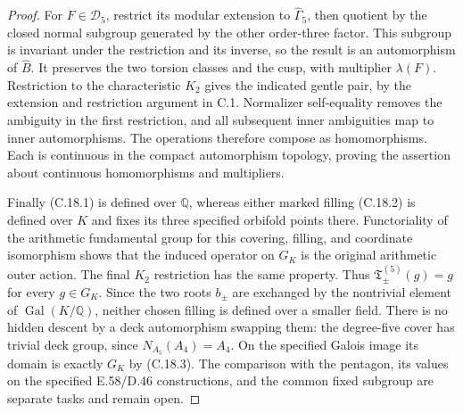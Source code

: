 \begin{proof}
For $F\in\mathcal D_5$, restrict its modular extension to
$\widehat\Gamma_5$, then quotient by the closed normal
subgroup generated by the other order-three factor. This
subgroup is invariant under the restriction and its inverse,
so the result is an automorphism of $\widehat B$.
It preserves the two torsion classes and the cusp, with
multiplier $\lambda(F)$. Restriction to the characteristic
$K_2$ gives the indicated gentle pair, by the extension and
restriction argument in C.1. Normalizer self-equality removes
the ambiguity in the first restriction, and all subsequent
inner ambiguities map to inner automorphisms. The operations
therefore compose as homomorphisms. Each is continuous in
the compact automorphism topology, proving the assertion
about continuous homomorphisms and multipliers.

Finally (C.18.1) is defined over $\mathbb Q$, whereas either
marked filling (C.18.2) is defined over $K$ and fixes its
three specified orbifold points there. Functoriality of the
arithmetic fundamental group for this covering, filling,
and coordinate isomorphism shows that the induced operator
on $G_K$ is the original arithmetic outer action. The final
$K_2$ restriction has the same property. Thus
$\mathfrak T^{(5)}_\pm(g)=g$ for every $g\in G_K$.
Since the two roots $b_\pm$ are exchanged by the nontrivial
element of $\operatorname{Gal}(K/\mathbb Q)$, neither chosen
filling is defined over a smaller field. There is no hidden
descent by a deck automorphism swapping them: the degree-five
cover has trivial deck group, since $N_{A_5}(A_4)=A_4$.
On the specified
Galois image its domain is exactly $G_K$ by (C.18.3).
The comparison with the pentagon, its values on the specified
E.58/D.46 constructions, and the common fixed subgroup are
separate tasks and remain open.
\end{proof}

